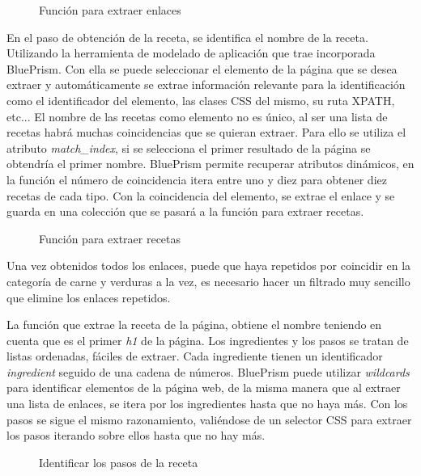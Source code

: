 \begin{figure}[h!]
    \centering
    \caption{Función para extraer enlaces}
    \label{fig:links}
\end{figure}

En el paso de obtención de la receta, se identifica el nombre de la receta. Utilizando la herramienta de modelado de aplicación que trae incorporada BluePrism. Con ella se puede seleccionar el elemento de la página que se desea extraer y automáticamente se extrae información relevante para la identificación como el identificador del elemento, las clases CSS del mismo, su ruta XPATH, etc... El nombre de las recetas como elemento no es único, al ser una lista de recetas habrá muchas coincidencias que se quieran extraer. Para ello se utiliza el atributo \emph{match_index}, si se selecciona el primer resultado de la página se obtendría el primer nombre. BluePrism permite recuperar atributos dinámicos, en la función el número de coincidencia itera entre uno y diez para obtener diez recetas de cada tipo. Con la coincidencia del elemento, se extrae el enlace y se guarda en una colección que se pasará a la función para extraer recetas. 

\begin{figure}[h!]
    \centering
    \caption{Función para extraer recetas}
    \label{fig:recipe}
\end{figure}

Una vez obtenidos todos los enlaces, puede que haya repetidos por coincidir en la categoría de carne y verduras a la vez, es necesario hacer un filtrado muy sencillo que elimine los enlaces repetidos. 

La función que extrae la receta de la página, obtiene el nombre teniendo en cuenta que es el primer \emph{h1} de la página. Los ingredientes y los pasos se tratan de listas ordenadas, fáciles de extraer. Cada ingrediente tienen un identificador \emph{ingredient} seguido de una cadena de números. BluePrism puede utilizar \emph{wildcards} para identificar elementos de la página web, de la misma manera que al extraer una lista de enlaces, se itera por los ingredientes hasta que no haya más. Con los pasos se sigue el mismo razonamiento, valiéndose de un selector CSS para extraer los pasos iterando sobre ellos hasta que no hay más. 

\begin{figure}[h!]
    \centering
    \caption{Identificar los pasos de la receta}
    \label{fig:steps}
\end{figure}


